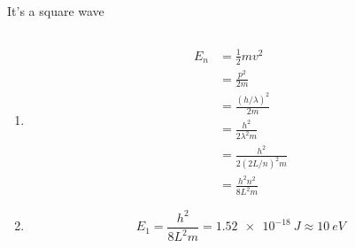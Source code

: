 \documentclass{article}
\begin{document}
\subsection{}

It's a square wave

\subsection{}

\begin{enumerate}
  \item

        \begin{align*}
          E_n & = \frac{1}{2} m v^2           \\
              & = \frac{p^2}{2 m}             \\
              & = \frac{(h / \lambda)^2}{2 m} \\
              & = \frac{h^2}{2 \lambda^2 m}   \\
              & = \frac{h^2}{2 (2 L / n)^2 m} \\
              & = \frac{h^2 n^2}{8 L^2 m}
        \end{align*}

  \item \[E_1 = \frac{h^2}{8 L^2 m} = \qty{1.52e-18}{J} \approx \qty{10}{eV}\]
\end{enumerate}
\end{document}
